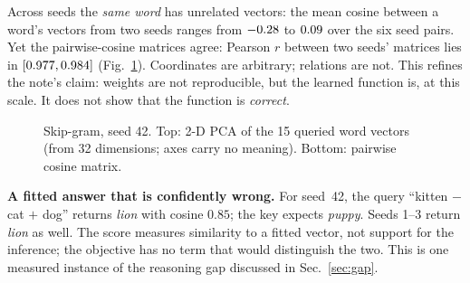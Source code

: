 \documentclass[conference]{IEEEtran}
\begin{document}
Across seeds the \emph{same word} has unrelated vectors: the mean cosine between a word's vectors from two seeds ranges from $-0.28$ to $0.09$ over the six seed pairs. Yet the pairwise-cosine matrices agree: Pearson $r$ between two seeds' matrices lies in $[0.977,0.984]$ (Fig.~\ref{fig:geometry}). Coordinates are arbitrary; relations are not. This refines the note's claim: weights are not reproducible, but the learned function is, at this scale. It does not show that the function is \emph{correct}.

\begin{figure}[t]
\centering
{}

\medskip
{}
\caption{Skip-gram, seed 42. Top: 2-D PCA of the 15 queried word vectors (from 32 dimensions; axes carry no meaning). Bottom: pairwise cosine matrix.}
\label{fig:geometry}
\end{figure}

\textbf{A fitted answer that is confidently wrong.} For seed~42, the query ``kitten $-$ cat $+$ dog'' returns \emph{lion} with cosine $0.85$; the key expects \emph{puppy}. Seeds 1--3 return \emph{lion} as well. The score measures similarity to a fitted vector, not support for the inference; the objective has no term that would distinguish the two. This is one measured instance of the reasoning gap discussed in Sec.~\ref{sec:gap}.
\end{document}
